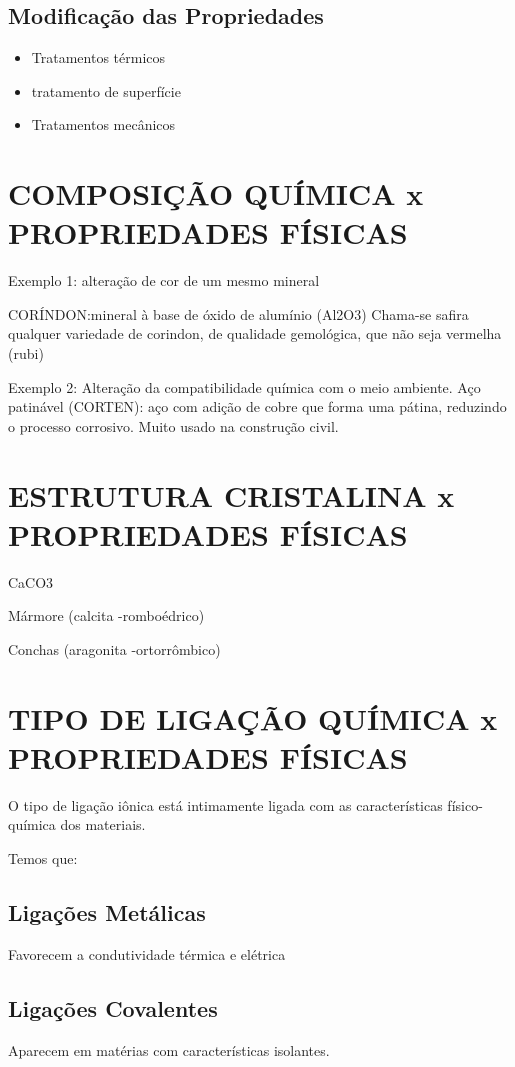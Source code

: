 \subsection*{Modificação das Propriedades}
\begin{itemize}
		
	\setlength{\parskip}{0pt}
	\setlength{\itemsep}{0pt plus 1pt}
	
	\item Tratamentos térmicos
	\item tratamento de superfície
	\item Tratamentos mecânicos
\end{itemize}


\section{COMPOSIÇÃO QUÍMICA x PROPRIEDADES FÍSICAS}
Exemplo 1: alteração de cor de um mesmo mineral

CORÍNDON:mineral à base de óxido de alumínio (Al2O3)
Chama-se safira qualquer variedade de corindon, de qualidade gemológica, que não seja vermelha (rubi)

Exemplo 2: Alteração da compatibilidade química com o meio ambiente.
Aço patinável (CORTEN): aço com adição de cobre que forma uma pátina, reduzindo o processo corrosivo. Muito usado na construção civil.



\section{ESTRUTURA CRISTALINA x PROPRIEDADES FÍSICAS}
CaCO3

Mármore (calcita -romboédrico)

Conchas (aragonita -ortorrômbico)

\section{TIPO DE LIGAÇÃO QUÍMICA x PROPRIEDADES FÍSICAS}

O tipo de ligação iônica está intimamente ligada com as características físico-química dos materiais.

Temos que:
\subsection*{Ligações Metálicas}
Favorecem a condutividade térmica e elétrica

\subsection*{Ligações Covalentes}
Aparecem em matérias com características isolantes. 


